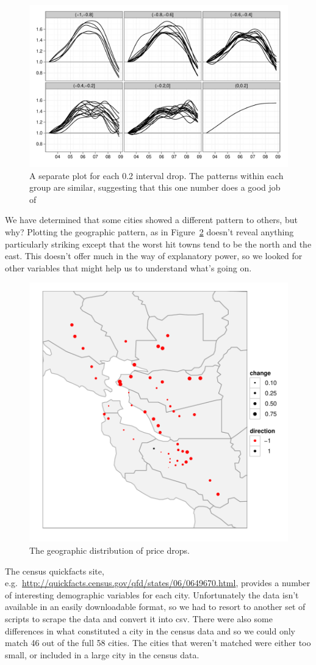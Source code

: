 \documentclass[oneside]{article}
\begin{document}
\begin{figure}[htbp]
  \centering
    \includegraphics[width=0.75\linewidth]{cities-indexed-grouped}
  \caption{A separate plot for each 0.2 interval drop.  The patterns within each group are similar, suggesting that this one number does a good job of  }
  \label{fig:groups}
\end{figure}

We have determined that some cities showed a different pattern to others, but why? Plotting the geographic pattern, as in Figure~\ref{fig:geo} doesn't reveal anything particularly striking except that the worst hit towns tend to be the north and the east. This doesn't offer much in the way of explanatory power, so we looked for other variables that might help us to understand what's going on. 

\begin{figure}[htbp]
  \centering
    \includegraphics[width=0.4\linewidth]{cities-geo-changes}
  \caption{The geographic distribution of price drops.}
  \label{fig:geo}
\end{figure}

The census quickfacts site, e.g.\ \url{http://quickfacts.census.gov/qfd/states/06/0649670.html}, provides a number of interesting demographic variables for each city.  Unfortunately the data isn't available in an easily downloadable format, so we had to resort to another set of scripts to scrape the data and convert it into csv.  There were also some differences in what constituted a city in the census data and so we could only match 46 out of the full 58 cities.  The cities that weren't matched were either too small, or included in a large city in the census data.
\end{document}
